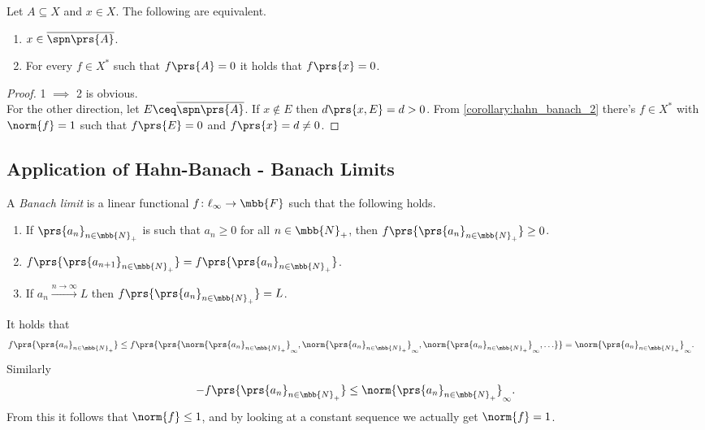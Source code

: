 \documentclass[10pt, twoside]{book}
\begin{document}
\begin{corollary} \label{corollary:hahn_banach_3}
Let $A \subseteq X$ and $x \in X$. The following are equivalent.
\begin{enumerate}
\item $x \in \overline{\spn\prs{A}}$.
\item For every $f \in X^*$ such that $f\prs{A} = 0$ it holds that $f\prs{x} = 0$.
\end{enumerate}
\end{corollary}

\begin{proof}
1 $\implies$ 2 is obvious.
\\
For the other direction, let $E \ceq \overline{\spn\prs{A}}$. If $x \notin E$ then $d\prs{x, E} = d > 0$. From \ref{corollary:hahn_banach_2} there's $f \in X^*$ with $\norm{f} = 1$ such that $f\prs{E} = 0$ and $f\prs{x} = d \neq 0$.
\end{proof}

\subsection{Application of Hahn-Banach - Banach Limits}

\begin{definition}
A \emph{Banach limit} is a linear functional $f \colon \ell_\infty \to \mbb{F}$ such that the following holds.
\begin{enumerate}
\item If $\prs{a_n}_{n \in \mbb{N}_+}$ is such that $a_n \geq 0$ for all $n \in \mbb{N}_+$, then $f\prs{\prs{a_n}_{n \in \mbb{N}_+}} \geq 0$.
\item $f\prs{\prs{a_{n+1}}_{n \in \mbb{N}_+}} = f\prs{\prs{a_n}_{n \in \mbb{N}_+}}$.
\item If $a_n \xrightarrow{n\to\infty} L$ then $f\prs{\prs{a_n}_{n \in \mbb{N}_+}} = L$.
\end{enumerate}
\end{definition}

\begin{remark}
It holds that
\begin{align*}
f\prs{\prs{a_n}_{n \in \mbb{N}_+}} &\leq f\prs{\prs{\norm{\prs{a_n}_{n \in \mbb{N}_+}}_\infty, \norm{\prs{a_n}_{n \in \mbb{N}_+}}_\infty, \norm{\prs{a_n}_{n \in \mbb{N}_+}}_\infty, \ldots}} = \norm{\prs{a_n}_{n \in \mbb{N}_+}}_\infty \text{.}
\end{align*}
Similarly
\[-f\prs{\prs{a_n}_{n \in \mbb{N}_+}} \leq \norm{\prs{a_n}_{n \in \mbb{N}_+}}_\infty \text{.}\]
From this it follows that $\norm{f} \leq 1$, and by looking at a constant sequence we actually get $\norm{f} = 1$.
\end{remark}
\end{document}
